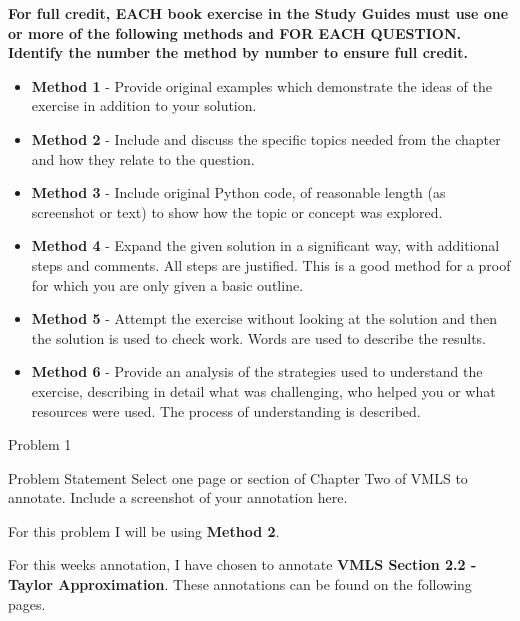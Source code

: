 \textbf{For full credit,  EACH book exercise in the Study Guides must use one or more of the following methods and FOR EACH QUESTION.  Identify the number the method by number to ensure full credit.}

\begin{itemize}
    \item \textbf{Method 1} - Provide original examples which demonstrate the ideas of the exercise in addition to your solution.
    \item \textbf{Method 2} - Include and discuss the specific topics needed from the chapter and how they relate to the question.
    \item \textbf{Method 3} - Include original Python code, of reasonable length (as screenshot or text)  to show how the topic or concept was explored.
    \item \textbf{Method 4} - Expand the given solution in a significant way, with additional steps and comments. All steps are justified. This is a good method for a proof for which you are only given a basic outline.
    \item \textbf{Method 5} - Attempt the exercise without looking at the solution and then the solution is used to check work. Words are used to describe the results.
    \item \textbf{Method 6} - Provide an analysis of the strategies used to understand the exercise, describing in detail what was challenging, who helped you or what resources were used. The process of understanding is
    described.
\end{itemize}

\begin{problem}{Problem 1}
    \begin{statement}{Problem Statement}
        Select one page or section of Chapter Two of VMLS to annotate. Include a screenshot of your annotation here.
    \end{statement}

    For this problem I will be using \textbf{Method 2}. \vspace*{1em}

    For this weeks annotation, I have chosen to annotate \textbf{VMLS Section 2.2 - Taylor Approximation}. These annotations can be found on the following pages.

    
\end{problem}

